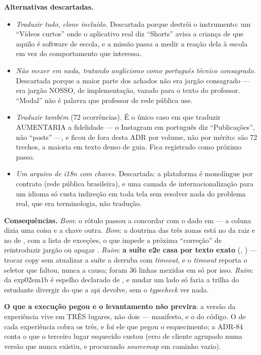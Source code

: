 \textbf{Alternativas descartadas.}
\begin{itemize}
  \item \emph{Traduzir tudo, clone incluído.} Descartada porque destrói o
    instrumento: um \enquote{Vídeos curtos} onde o aplicativo real diz
    \enquote{Shorts} avisa a criança de que aquilo é software de escola, e a
    missão passa a medir a reação dela à escola em vez do comportamento que
    interessa.
  \item \emph{Não mexer em nada, tratando anglicismo como português técnico
    consagrado.} Descartada porque a maior parte dos achados não era jargão
    consagrado --- era jargão NOSSO, de implementação, vazado para o texto do
    professor. \enquote{Modal} não é palavra que professor de rede pública use.
  \item \emph{Traduzir também  \seta{} } (72
    ocorrências). É o único caso em que traduzir AUMENTARIA a fidelidade --- o
    Instagram em português diz \enquote{Publicações}, não \enquote{posts} ---, e
    ficou de fora desta ADR por volume, não por mérito: são 72 trechos, a maioria
    em texto denso de guia. Fica registrado como próximo passo.
  \item \emph{Um arquivo de i18n com chaves.} Descartada: a plataforma é
    monolíngue por contrato (rede pública brasileira), e uma camada de
    internacionalização para um idioma só custa indireção em toda tela sem
    resolver nada do problema real, que era terminologia, não tradução.
\end{itemize}

\textbf{Consequências.} \emph{Bom}: o rótulo passou a concordar com o dado em
 \seta{}  --- a coluna dizia uma coisa e a chave
 outra. \emph{Bom}: a doutrina das três zonas está no
 da raiz e no de , com a lista de exceções,
o que impede a próxima \enquote{correção} de reintroduzir jargão ou apagar
. \emph{Ruim}: \textbf{a suíte e2e casa por texto exato}
(, ) --- trocar copy sem atualizar a suíte
a derruba com \emph{timeout}, e o \emph{timeout} reporta o seletor que faltou,
nunca a causa; foram 36 linhas mexidas em  só por
isso. \emph{Ruim}:  da exp02em1b é espelho declarado de
, e mudar um lado só faria a trilha do
estudante divergir do que a api devolve, sem o \emph{typecheck} ver nada.

\textbf{O que a execução pegou e o levantamento não previra}: a versão da
experiência vive em TRÊS lugares, não dois --- manifesto,  e o
 do código. O  de cada experiência cobra os
três, e foi ele que pegou o esquecimento; a ADR-84 conta o que o terceiro lugar
esquecido custou (erro de cliente agrupado numa versão que nunca existiu, e
 procurando \emph{sourcemap} em caminho vazio).

